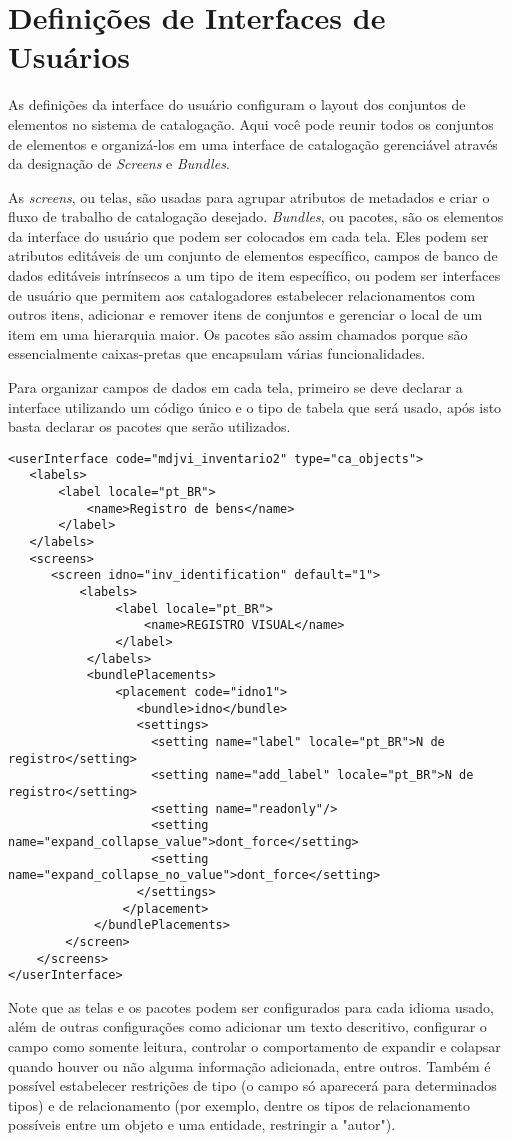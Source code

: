 \section{Definições de Interfaces de Usuários}

As definições da interface do usuário configuram o layout dos conjuntos de elementos no sistema de catalogação. Aqui você pode reunir todos os conjuntos de elementos e organizá-los em uma interface de catalogação gerenciável através da designação de \textit{Screens} e \textit{Bundles}.

As \textit{screens}, ou telas, são usadas para agrupar atributos de metadados e criar o fluxo de trabalho de catalogação desejado. \textit{Bundles}, ou pacotes, são os elementos da interface do usuário que podem ser colocados em cada tela. Eles podem ser atributos editáveis de um conjunto de elementos específico, campos de banco de dados editáveis intrínsecos a um tipo de item específico, ou podem ser interfaces de usuário que permitem aos catalogadores estabelecer relacionamentos com outros itens, adicionar e remover itens de conjuntos e gerenciar o local de um item em uma hierarquia maior. Os pacotes são assim chamados porque são essencialmente caixas-pretas que encapsulam várias funcionalidades.

Para organizar campos de dados em cada tela, primeiro se deve declarar a interface utilizando um código único e o tipo de tabela que será usado, após isto basta declarar os pacotes que serão utilizados.

\begin{lstlisting}
<userInterface code="mdjvi_inventario2" type="ca_objects">
   <labels>
	   <label locale="pt_BR">
		   <name>Registro de bens</name>
	   </label>
   </labels>
   <screens>
      <screen idno="inv_identification" default="1">
	      <labels>
    		   <label locale="pt_BR">
				   <name>REGISTRO VISUAL</name>
			   </label>
		   </labels>
		   <bundlePlacements>
			   <placement code="idno1">
	    		  <bundle>idno</bundle>
		          <settings>
				    <setting name="label" locale="pt_BR">N de registro</setting>
				 	<setting name="add_label" locale="pt_BR">N de registro</setting>
					<setting name="readonly"/>
					<setting name="expand_collapse_value">dont_force</setting>
					<setting name="expand_collapse_no_value">dont_force</setting>
				  </settings>
				</placement>
			</bundlePlacements>
		</screen>
	</screens>
</userInterface>
\end{lstlisting}

Note que as telas e os pacotes podem ser configurados para cada idioma usado, além de outras configurações como adicionar um texto descritivo, configurar o campo como somente leitura, controlar o comportamento de expandir e colapsar quando houver ou não alguma informação adicionada, entre outros. Também é possível estabelecer restrições de tipo (o campo só aparecerá para determinados tipos) e de relacionamento (por exemplo, dentre os tipos de relacionamento possíveis entre um objeto e uma entidade, restringir a "autor").

